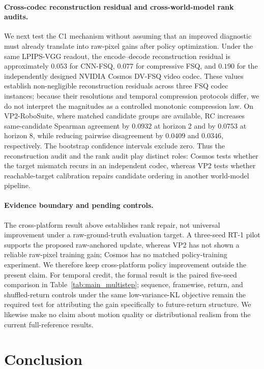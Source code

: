 \documentclass[letterpaper]{article} %
\begin{document}
\paragraph{Cross-codec reconstruction residual and cross-world-model rank audits.}
We next test the C1 mechanism without assuming that an improved diagnostic must already translate into raw-pixel gains after policy optimization. Under the same LPIPS-VGG readout, the encode--decode reconstruction residual is approximately $0.053$ for CNN-FSQ, $0.077$ for compressive FSQ, and $0.190$ for the independently designed NVIDIA Cosmos DV-FSQ video codec. These values establish non-negligible reconstruction residuals across three FSQ codec instances; because their resolutions and temporal compression protocols differ, we do not interpret the magnitudes as a controlled monotonic compression law. On VP2-RoboSuite, where matched candidate groups are available, RC increases same-candidate Spearman agreement by $0.0932$ at horizon 2 and by $0.0753$ at horizon 8, while reducing pairwise disagreement by $0.0409$ and $0.0346$, respectively. The bootstrap confidence intervals exclude zero. Thus the reconstruction audit and the rank audit play distinct roles: Cosmos tests whether the target mismatch recurs in an independent codec, whereas VP2 tests whether reachable-target calibration repairs candidate ordering in another world-model pipeline.

\paragraph{Evidence boundary and pending controls.}
The cross-platform result above establishes rank repair, not universal improvement under a raw-ground-truth evaluation target. A three-seed RT-1 pilot supports the proposed raw-anchored update, whereas VP2 has not shown a reliable raw-pixel training gain; Cosmos has no matched policy-training experiment. We therefore keep cross-platform policy improvement outside the present claim. For temporal credit, the formal result is the paired five-seed comparison in Table~\ref{tab:main_multistep}; sequence, framewise, return, and shuffled-return controls under the same low-variance-KL objective remain the required test for attributing the gain specifically to future-return structure. We likewise make no claim about motion quality or distributional realism from the current full-reference results.

\section{Conclusion}
\end{document}
